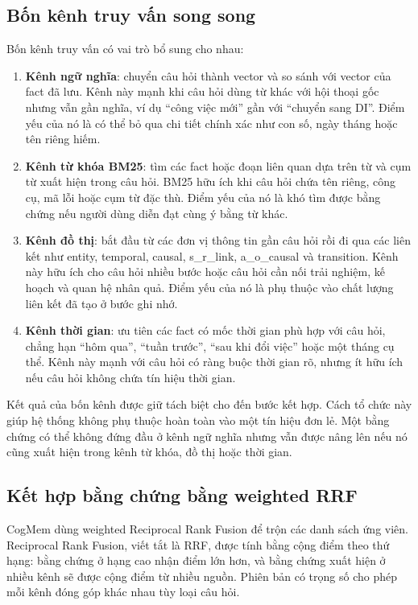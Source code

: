 \documentclass[../main.tex]{subfiles}
\begin{document}
\subsection{Bốn kênh truy vấn song song}

Bốn kênh truy vấn có vai trò bổ sung cho nhau:

\begin{enumerate}
    \item \textbf{Kênh ngữ nghĩa}: chuyển câu hỏi thành vector và so sánh với vector của fact đã lưu. Kênh này mạnh khi câu hỏi dùng từ khác với hội thoại gốc nhưng vẫn gần nghĩa, ví dụ ``công việc mới'' gần với ``chuyển sang DI''. Điểm yếu của nó là có thể bỏ qua chi tiết chính xác như con số, ngày tháng hoặc tên riêng hiếm.
    \item \textbf{Kênh từ khóa BM25}: tìm các fact hoặc đoạn liên quan dựa trên từ và cụm từ xuất hiện trong câu hỏi. BM25 hữu ích khi câu hỏi chứa tên riêng, công cụ, mã lỗi hoặc cụm từ đặc thù. Điểm yếu của nó là khó tìm được bằng chứng nếu người dùng diễn đạt cùng ý bằng từ khác.
    \item \textbf{Kênh đồ thị}: bắt đầu từ các đơn vị thông tin gần câu hỏi rồi đi qua các liên kết như entity, temporal, causal, s\_r\_link, a\_o\_causal và transition. Kênh này hữu ích cho câu hỏi nhiều bước hoặc câu hỏi cần nối trải nghiệm, kế hoạch và quan hệ nhân quả. Điểm yếu của nó là phụ thuộc vào chất lượng liên kết đã tạo ở bước ghi nhớ.
    \item \textbf{Kênh thời gian}: ưu tiên các fact có mốc thời gian phù hợp với câu hỏi, chẳng hạn ``hôm qua'', ``tuần trước'', ``sau khi đổi việc'' hoặc một tháng cụ thể. Kênh này mạnh với câu hỏi có ràng buộc thời gian rõ, nhưng ít hữu ích nếu câu hỏi không chứa tín hiệu thời gian.
\end{enumerate}

Kết quả của bốn kênh được giữ tách biệt cho đến bước kết hợp. Cách tổ chức này giúp hệ thống không phụ thuộc hoàn toàn vào một tín hiệu đơn lẻ. Một bằng chứng có thể không đứng đầu ở kênh ngữ nghĩa nhưng vẫn được nâng lên nếu nó cũng xuất hiện trong kênh từ khóa, đồ thị hoặc thời gian.

\subsection{Kết hợp bằng chứng bằng weighted RRF}

CogMem dùng weighted Reciprocal Rank Fusion để trộn các danh sách ứng viên. Reciprocal Rank Fusion, viết tắt là RRF, được tính bằng cộng điểm theo thứ hạng: bằng chứng ở hạng cao nhận điểm lớn hơn, và bằng chứng xuất hiện ở nhiều kênh sẽ được cộng điểm từ nhiều nguồn. Phiên bản có trọng số cho phép mỗi kênh đóng góp khác nhau tùy loại câu hỏi.
\end{document}
